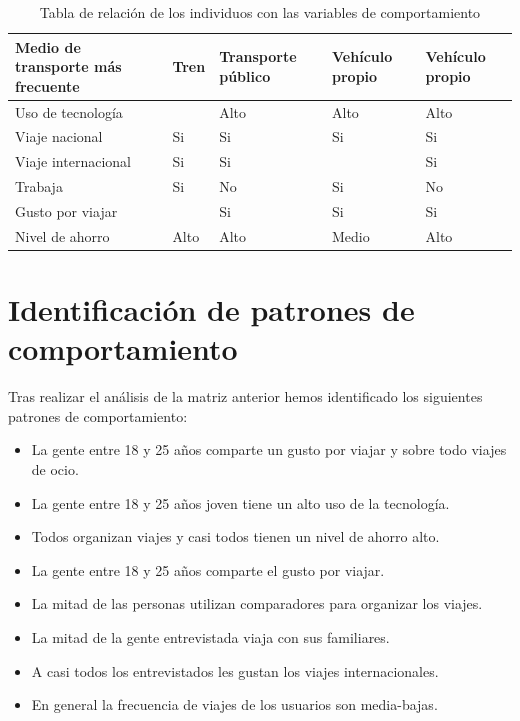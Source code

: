 \begin{table}[H]
\begin{tabular}{|p{10em}||p{7em}|p{7em}|p{7em}|p{8em}|}
        Medio de transporte más frecuente & Tren        & Transporte público             & Vehículo propio    & Vehículo propio                 \\ \hline
        Uso de tecnología                 &             & Alto                           & Alto               & Alto                            \\ \hline
        Viaje nacional                    & Si          & Si                             & Si                 & Si                              \\ \hline
        Viaje internacional               & Si          & Si                             &                    & Si                              \\ \hline
        Trabaja                           & Si          & No                             & Si                 & No                              \\ \hline
        Gusto por viajar                  &             & Si                             & Si                 & Si                              \\ \hline
        Nivel de ahorro                   & Alto        & Alto                           & Medio              & Alto                            \\ \hline
    \end{tabular}
    \caption{Tabla de relación de los individuos con las variables de comportamiento}
    \label{table:relacion-individuos-variables}
\end{table}

\section{Identificación de patrones de comportamiento}
Tras realizar el análisis de la matriz anterior hemos identificado los siguientes patrones de comportamiento:
\begin{itemize}
    \item La gente entre 18 y 25 años comparte un gusto por viajar y sobre todo viajes de ocio.
    \item La gente entre 18 y 25 años joven tiene un alto uso de la tecnología.
    \item Todos organizan viajes y casi todos tienen un nivel de ahorro alto. 
    \item La gente entre 18 y 25 años comparte el gusto por viajar.
    \item La mitad de las personas utilizan comparadores para organizar los viajes.
    \item La mitad de la gente entrevistada viaja con sus familiares.
    \item A casi todos los entrevistados les gustan los viajes internacionales.
    \item En general la frecuencia de viajes de los usuarios son media-bajas.
\end{itemize}

